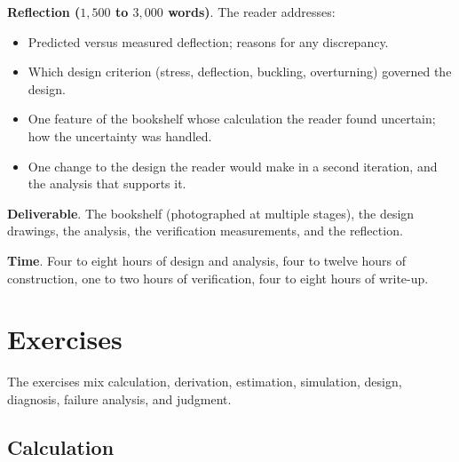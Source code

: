 \begin{project}
\textbf{Reflection ($1{,}500$ to $3{,}000$ words)}. The reader
addresses:

\begin{itemize}[leftmargin=*]
  \item Predicted versus measured deflection; reasons for any
    discrepancy.
  \item Which design criterion (stress, deflection, buckling,
    overturning) governed the design.
  \item One feature of the bookshelf whose calculation the reader
    found uncertain; how the uncertainty was handled.
  \item One change to the design the reader would make in a second
    iteration, and the analysis that supports it.
\end{itemize}

\textbf{Deliverable}. The bookshelf (photographed at multiple
stages), the design drawings, the analysis, the verification
measurements, and the reflection.

\textbf{Time}. Four to eight hours of design and analysis, four to
twelve hours of construction, one to two hours of verification, four
to eight hours of write-up.
\end{project}

\section{Exercises}

The exercises mix calculation, derivation, estimation, simulation,
design, diagnosis, failure analysis, and judgment.

\subsection*{Calculation}

